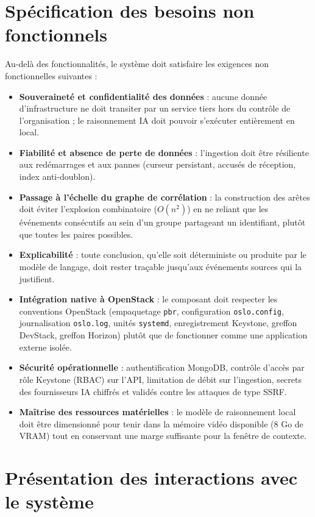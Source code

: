 \documentclass[a4paper,11pt,oneside]{report}
\begin{document}
\section{Spécification des besoins non fonctionnels}
Au-delà des fonctionnalités, le système doit satisfaire les exigences non fonctionnelles suivantes :
\begin{itemize}
    \item \textbf{Souveraineté et confidentialité des données} : aucune donnée d'infrastructure ne doit transiter par un service tiers hors du contrôle de l'organisation ; le raisonnement IA doit pouvoir s'exécuter entièrement en local.
    \item \textbf{Fiabilité et absence de perte de données} : l'ingestion doit être résiliente aux redémarrages et aux pannes (curseur persistant, accusés de réception, index anti-doublon).
    \item \textbf{Passage à l'échelle du graphe de corrélation} : la construction des arêtes doit éviter l'explosion combinatoire ($O(n^2)$) en ne reliant que les événements consécutifs au sein d'un groupe partageant un identifiant, plutôt que toutes les paires possibles.
    \item \textbf{Explicabilité} : toute conclusion, qu'elle soit déterministe ou produite par le modèle de langage, doit rester traçable jusqu'aux événements sources qui la justifient.
    \item \textbf{Intégration native à OpenStack} : le composant doit respecter les conventions OpenStack (empaquetage \texttt{pbr}, configuration \texttt{oslo.config}, journalisation \texttt{oslo.log}, unités \texttt{systemd}, enregistrement Keystone, greffon DevStack, greffon Horizon) plutôt que de fonctionner comme une application externe isolée.
    \item \textbf{Sécurité opérationnelle} : authentification MongoDB, contrôle d'accès par rôle Keystone (RBAC) sur l'API, limitation de débit sur l'ingestion, secrets des fournisseurs IA chiffrés et validés contre les attaques de type SSRF.
    \item \textbf{Maîtrise des ressources matérielles} : le modèle de raisonnement local doit être dimensionné pour tenir dans la mémoire vidéo disponible (8 Go de VRAM) tout en conservant une marge suffisante pour la fenêtre de contexte.
\end{itemize}

\section{Présentation des interactions avec le système}
\end{document}
